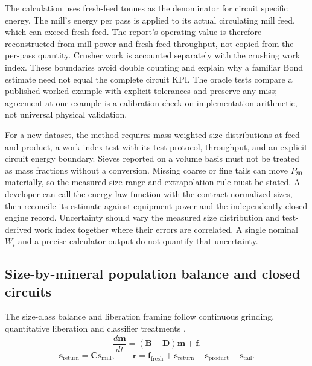 \documentclass[10pt]{article}
\begin{document}
The calculation uses fresh-feed tonnes as the denominator for circuit
specific energy. The mill's energy per pass is applied to its actual
circulating mill feed, which can exceed fresh feed. The report's
operating value is therefore reconstructed from mill power and
fresh-feed throughput, not copied from the per-pass quantity. Crusher
work is accounted separately with the crushing work index. These
boundaries avoid double counting and explain why a familiar Bond
estimate need not equal the complete circuit KPI. The oracle tests
compare a published worked example with explicit tolerances and preserve
any miss; agreement at one example is a calibration check on
implementation arithmetic, not universal physical validation.

For a new dataset, the method requires mass-weighted size distributions
at feed and product, a work-index test with its test protocol,
throughput, and an explicit circuit energy boundary. Sieves reported on
a volume basis must not be treated as mass fractions without a
conversion. Missing coarse or fine tails can move \(P_{80}\) materially,
so the measured size range and extrapolation rule must be stated. A
developer can call the energy-law function with the contract-normalized
sizes, then reconcile its estimate against equipment power and the
independently closed engine record. Uncertainty should vary the measured
size distribution and test-derived work index together where their
errors are correlated. A single nominal \(W_i\) and a precise calculator
output do not quantify that uncertainty.

\subsection{Size-by-mineral population balance and closed
circuits}\label{size-by-mineral-population-balance-and-closed-circuits}

\label{method-population-balance}

The size-class balance and liberation framing follow continuous
grinding, quantitative liberation and classifier treatments
\cite{herbst1980,king1979,plitt1976}. \begin{equation}
\frac{d\mathbf{m}}{dt}=(\mathbf{B}-\mathbf{D})\mathbf{m}+\mathbf{f}.
\end{equation} \begin{equation}
\mathbf{s}_{\mathrm{return}}=\mathbf{C}\mathbf{s}_{\mathrm{mill}},
\qquad
\mathbf{r}=\mathbf{f}_{\mathrm{fresh}}+\mathbf{s}_{\mathrm{return}}-\mathbf{s}_{\mathrm{product}}-\mathbf{s}_{\mathrm{tail}}.
\end{equation}
\end{document}

